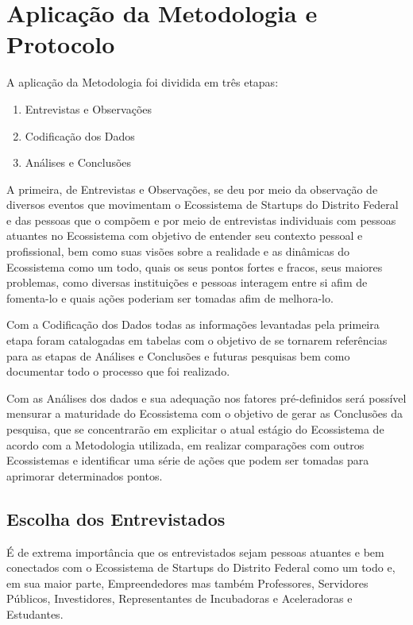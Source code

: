\section{Aplicação da Metodologia e Protocolo}
\label{section:aplicacao_da_metodologia}

A aplicação da Metodologia foi dividida em três etapas:

\begin{enumerate}
  \item Entrevistas e Observações
  \item Codificação dos Dados
  \item Análises e Conclusões
\end{enumerate}

A primeira, de Entrevistas e Observações, se deu por meio da observação de diversos eventos que movimentam o Ecossistema de Startups do Distrito Federal e das pessoas que o compõem e por meio de entrevistas individuais com pessoas atuantes no Ecossistema com objetivo de entender seu contexto pessoal e profissional, bem como suas visões sobre a realidade e as dinâmicas do Ecossistema como um todo, quais os seus pontos fortes e fracos, seus maiores problemas, como diversas instituições e pessoas interagem entre si afim de fomenta-lo e quais ações poderiam ser tomadas afim de melhora-lo.

Com a Codificação dos Dados todas as informações levantadas pela primeira etapa foram catalogadas em tabelas com o objetivo de se tornarem referências para as etapas de Análises e Conclusões e futuras pesquisas bem como documentar todo o processo que foi realizado. 

Com as Análises dos dados e sua adequação nos fatores pré-definidos será possível mensurar a maturidade do Ecossistema com o objetivo de gerar as Conclusões da pesquisa, que se concentrarão em explicitar o atual estágio do Ecossistema de acordo com a Metodologia utilizada, em realizar comparações com outros Ecossistemas e identificar uma série de ações que podem ser tomadas para aprimorar determinados pontos.

\subsection{Escolha dos Entrevistados}
\label{subsection:escolha_dos_entrevistados}

É de extrema importância que os entrevistados sejam pessoas atuantes e bem conectados com o Ecossistema de Startups do Distrito Federal como um todo e, em sua maior parte, Empreendedores mas também Professores, Servidores Públicos, Investidores, Representantes de Incubadoras e Aceleradoras e Estudantes. 

